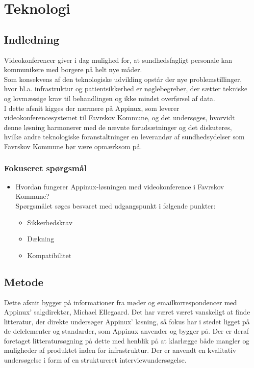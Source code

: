 \chapter{Teknologi}
\label{chap:teknologiafsnit}
\section{Indledning}

Videokonferencer giver i dag mulighed for, at sundhedsfagligt personale kan kommunikere med borgere på helt nye måder.
\\
Som konsekvens af den teknologiske udvikling opstår der nye problemstillinger, hvor bl.a. infrastruktur og patientsikkerhed er nøglebegreber, der sætter tekniske og lovmæssige krav til behandlingen og ikke mindst overførsel af data.
\\
I dette afsnit kigges der nærmere på Appinux, som leverer videokonferencesystemet til Favrskov Kommune, og det undersøges, hvorvidt denne løsning harmonerer med de nævnte forudsætninger og det diskuteres, hvilke andre teknologiske foranstaltninger en leverandør af sundhedsydelser som Favrskov Kommune bør være opmærksom på.

\subsection{Fokuseret spørgsmål}
\begin{itemize}
	\item Hvordan fungerer Appinux-løsningen med videokonference i Favrskov Kommune? \\Spørgsmålet søges besvaret med udgangspunkt i følgende punkter:
	\begin{itemize}
	\item Sikkerhedskrav
	\item Dækning 
	\item Kompatibilitet 
\end{itemize}
\end{itemize}


\section{Metode}
Dette afsnit bygger på informationer fra møder og emailkorrespondencer med Appinux' salgdirektør, Michael Ellegaard. Det har været været vanskeligt at finde litteratur, der direkte undersøger Appinux' løsning, så fokus har i stedet ligget på de delelementer og standarder, som Appinux anvender og bygger på. Der er deraf foretaget litteratursøgning på dette med henblik på at klarlægge både mangler og muligheder af produktet inden for infrastruktur. Der er anvendt en kvalitativ undersøgelse i form af en struktureret interviewundersøgelse.

